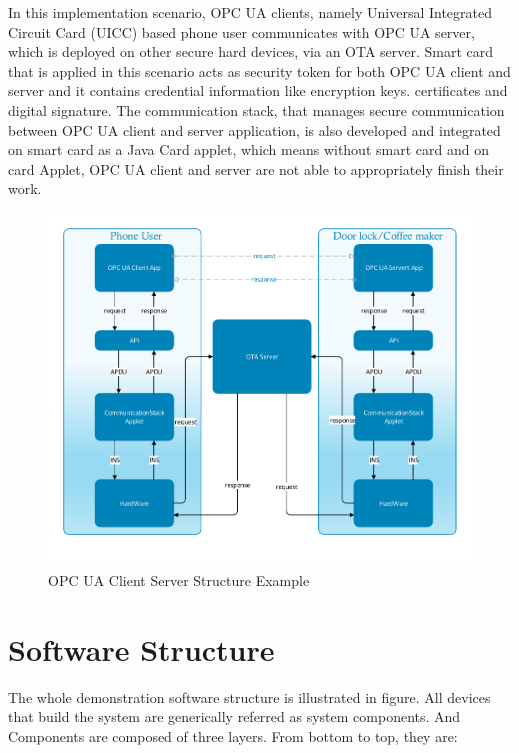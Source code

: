 In this implementation scenario, OPC UA clients, namely Universal Integrated Circuit Card (UICC)  based phone user communicates with OPC UA server, which is deployed on other secure hard devices, via an OTA server.   Smart card that is applied in this scenario acts as security token for both OPC UA client and server and it contains credential information like encryption keys. certificates and digital signature. The communication stack, that manages secure  communication between OPC UA client and server application, is also developed and integrated on smart card as a Java Card applet, which means without smart card and on card Applet, OPC UA client and server are not able to appropriately finish their work.


 \begin{figure}[ht]

	\centering
	\includegraphics[width=1.1\textwidth]{csoverview}
		\caption{OPC UA Client Server Structure Example}
	\label{fig:softwareStructure}
\end{figure}


\section {Software Structure}

The whole demonstration software structure is illustrated in figure. All devices that build the system are generically referred as system components. And Components are composed of three layers. From bottom to top, they are:

